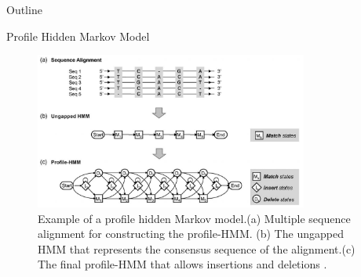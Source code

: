 \documentclass{beamer}
\begin{document}
\begin{frame}{Outline}
	\tableofcontents[currentsection]
\end{frame}

\begin{frame}{Profile Hidden Markov Model}
	\begin{figure}
	\centering
	\includegraphics[width = 0.8\textwidth]{profile.png}
	\caption{ Example of a profile hidden Markov model.(a) Multiple sequence alignment for constructing the profile-HMM. (b) The ungapped HMM that represents the consensus sequence of the alignment.(c) The final profile-HMM that allows insertions and deletions \cite{yoon2009hidden}.}
	\end{figure}
\end{frame}
\end{document}
